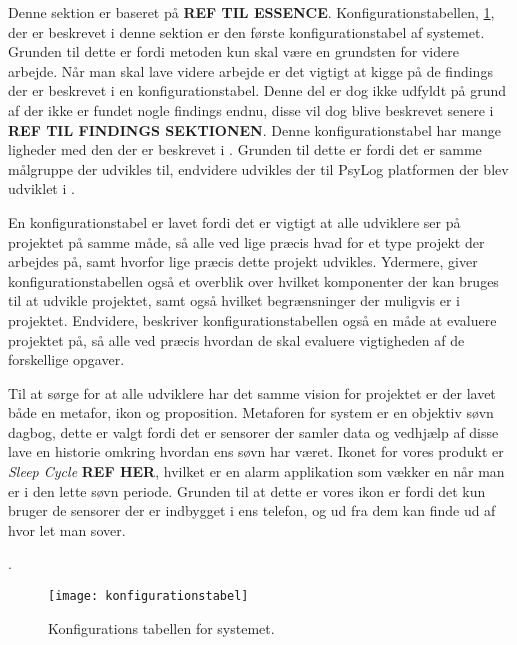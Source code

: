 Denne sektion er baseret på \textbf{REF TIL ESSENCE}.
Konfigurationstabellen, \cref{tab:konfigurationsTabel}, der er beskrevet i denne sektion er den første konfigurationstabel af systemet.
Grunden til dette er fordi metoden kun skal være en grundsten for videre arbejde.
Når man skal lave videre arbejde er det vigtigt at kigge på de findings der er beskrevet i en konfigurationstabel.
Denne del er dog ikke udfyldt på grund af der ikke er fundet nogle findings endnu, disse vil dog blive beskrevet senere i \textbf{REF TIL FINDINGS SEKTIONEN}.
Denne konfigurationstabel har mange ligheder med den der er beskrevet i \citet{misc:faellesrapp}.
Grunden til dette er fordi det er samme målgruppe der udvikles til, endvidere udvikles der til PsyLog platformen der blev udviklet i \citet{misc:faellesrapp}.

En konfigurationstabel er lavet fordi det er vigtigt at alle udviklere ser på projektet på samme måde, så alle ved lige præcis hvad for et type projekt der arbejdes på, samt hvorfor lige præcis dette projekt udvikles.
Ydermere, giver konfigurationstabellen også et overblik over hvilket komponenter der kan bruges til at udvikle projektet, samt også hvilket begrænsninger der muligvis er i projektet.
Endvidere, beskriver konfigurationstabellen også en måde at evaluere projektet på, så alle ved præcis hvordan de skal evaluere vigtigheden af de forskellige opgaver.

Til at sørge for at alle udviklere har det samme vision for projektet er der lavet både en metafor, ikon og proposition.
Metaforen for system er en objektiv søvn dagbog, dette er valgt fordi det er sensorer der samler data og vedhjælp af disse lave en historie omkring hvordan ens søvn har været.
Ikonet for vores produkt er \textit{Sleep Cycle} \textbf{REF HER}, hvilket er en alarm applikation som vækker en når man er i den lette søvn periode.
Grunden til at dette er vores ikon er fordi det kun bruger de sensorer der er indbygget i ens telefon, og ud fra dem kan finde ud af hvor let man sover.

.
\begin{figure}[h]
\texttt{[image: konfigurationstabel]}
\caption{Konfigurations tabellen for systemet.}
\label{tab:konfigurationsTabel}
\end{figure}